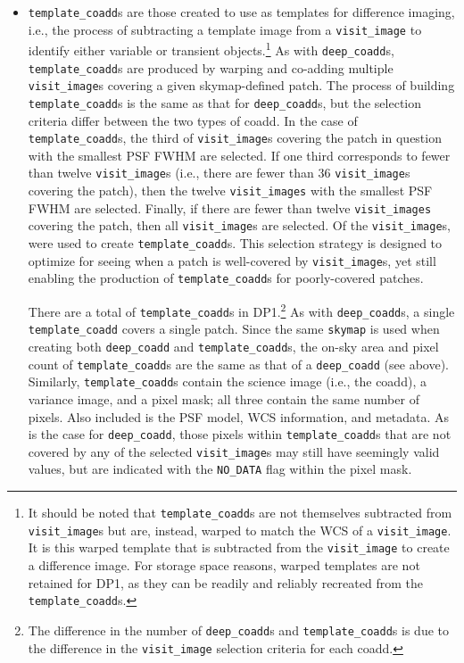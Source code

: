 \begin{itemize}
\item \texttt{template\_coadd}s are those created to use as templates for difference imaging, i.e., the process of subtracting a template image from a \texttt{visit\_image} to identify either variable or transient objects.\footnote{It should be noted that \texttt{template\_coadd}s are not themselves subtracted from \texttt{visit\_image}s but are, instead, warped to match the WCS of a \texttt{visit\_image}.
It is this warped template that is subtracted from the \texttt{visit\_image} to create a difference image.
For storage space reasons, warped templates are not retained for DP1, as they can be readily and reliably recreated from the \texttt{template\_coadd}s.}
As with \texttt{deep\_coadd}s, \texttt{template\_coadd}s are produced by warping and co-adding multiple \texttt{visit\_image}s covering a given skymap-defined patch.
The process of building \texttt{template\_coadd}s is the same as that for \texttt{deep\_coadd}s, but the selection criteria differ between the two types of coadd.
In the case of \texttt{template\_coadd}s, the third of \texttt{visit\_image}s covering the patch in question with the smallest PSF FWHM are selected.
If one third corresponds to fewer than twelve \texttt{visit\_image}s (i.e., there are fewer than 36 \texttt{visit\_image}s covering the patch), then the twelve \texttt{visit\_images} with the smallest PSF FWHM are selected.
Finally, if there are fewer than twelve \texttt{visit\_images} covering the patch, then all \texttt{visit\_image}s are selected. Of the \nvisitimages \texttt{visit\_image}s, \ntemplatevisitimages were used to create \texttt{template\_coadd}s.
This selection strategy is designed to optimize for seeing when a patch is well-covered by \texttt{visit\_image}s, yet still enabling the production of \texttt{template\_coadd}s for poorly-covered patches.  

There are a total of \ntemplatecoadds \texttt{template\_coadd}s in DP1.\footnote{The difference in the number of \texttt{deep\_coadd}s and \texttt{template\_coadd}s is due to the difference in the \texttt{visit\_image} selection criteria for each coadd.}
As with \texttt{deep\_coadd}s, a single \texttt{template\_coadd} covers a single patch.
Since the same \texttt{skymap} is used when creating both \texttt{deep\_coadd} and \texttt{template\_coadd}s, the on-sky area and pixel count of \texttt{template\_coadd}s are the same as that of a \texttt{deep\_coadd} (see above).
Similarly, \texttt{template\_coadd}s contain the science image (i.e., the coadd), a variance image, and a pixel mask; all three contain the same number of pixels.
Also included is the PSF model, WCS information, and metadata.
As is the case for \texttt{deep\_coadd}, those pixels within \texttt{template\_coadd}s that are not covered by any of the selected \texttt{visit\_image}s may still have seemingly valid values, but are indicated with the \texttt{NO\_DATA} flag within the pixel mask. 


\end{itemize}
